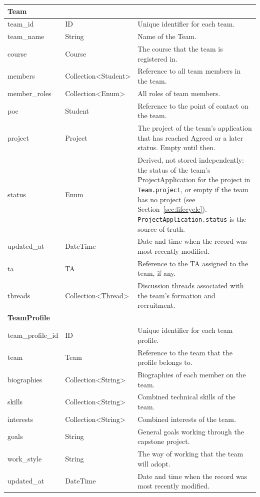 \documentclass[12pt]{article}
\begin{document}
\begin{longtable}{|
      p{}|
      p{}|
      p{}|
  }
      \multicolumn{3}{|l|}{\textbf{Team}}\\ \hline
      team\_id & ID & Unique identifier for each team. \\ \hline
      team\_name & String & Name of the Team. \\ \hline
      course & Course & The course that the team is registered in. \\ \hline
      members & Collection\textless Student\textgreater & Reference to all team members in the team. \\ \hline
      member\_roles & Collection\textless Enum\textgreater & All roles of team members. \\ \hline
      poc & Student & Reference to the point of contact on the team. \\ \hline
      project & Project & The project of the team's application that has reached Agreed or a later status. Empty until then. \\ \hline
      status & Enum & Derived, not stored independently: the status of the team's ProjectApplication for the project in \texttt{Team.project}, or empty if the team has no project (see Section~\ref{sec:lifecycle}). \texttt{ProjectApplication.status} is the source of truth. \\ \hline
      updated\_at & DateTime & Date and time when the record was most recently modified. \\ \hline
      ta & TA & Reference to the TA assigned to the team, if any. \\ \hline
      threads & Collection<Thread> & Discussion threads associated with the team's formation and recruitment.\\ \hline

      \multicolumn{3}{|l|}{\textbf{TeamProfile}}\\ \hline
      team\_profile\_id & ID & Unique identifier for each team profile. \\ \hline
      team & Team & Reference to the team that the profile belongs to. \\ \hline
      biographies & Collection\textless String\textgreater & Biographies of each member on the team. \\ \hline
      skills & Collection\textless String\textgreater & Combined technical skills of the team. \\ \hline
      interests & Collection\textless String\textgreater & Combined interests of the team. \\ \hline
      goals & String & General goals working through the capstone project. \\ \hline
      work\_style & String & The way of working that the team will adopt. \\ \hline
      updated\_at & DateTime & Date and time when the record was most recently modified. \\ \hline


\end{longtable}
\end{document}
